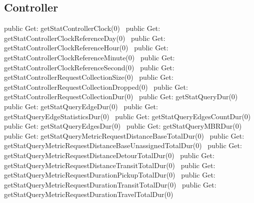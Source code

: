 \subsection{Controller}
\nwenddocs{}\plusendmoddef
public \LA{}Get: getStatControllerClock(0)~{\nwtagstyle{}}\RA{}
public \LA{}Get: getStatControllerClockReferenceDay(0)~{\nwtagstyle{}}\RA{}
public \LA{}Get: getStatControllerClockReferenceHour(0)~{\nwtagstyle{}}\RA{}
public \LA{}Get: getStatControllerClockReferenceMinute(0)~{\nwtagstyle{}}\RA{}
public \LA{}Get: getStatControllerClockReferenceSecond(0)~{\nwtagstyle{}}\RA{}
public \LA{}Get: getStatControllerRequestCollectionSize(0)~{\nwtagstyle{}}\RA{}
public \LA{}Get: getStatControllerRequestCollectionDropped(0)~{\nwtagstyle{}}\RA{}
public \LA{}Get: getStatControllerRequestCollectionDur(0)~{\nwtagstyle{}}\RA{}
public \LA{}Get: getStatQueryDur(0)~{\nwtagstyle{}}\RA{}
public \LA{}Get: getStatQueryEdgeDur(0)~{\nwtagstyle{}}\RA{}
public \LA{}Get: getStatQueryEdgeStatisticsDur(0)~{\nwtagstyle{}}\RA{}
public \LA{}Get: getStatQueryEdgesCountDur(0)~{\nwtagstyle{}}\RA{}
public \LA{}Get: getStatQueryEdgesDur(0)~{\nwtagstyle{}}\RA{}
public \LA{}Get: getStatQueryMBRDur(0)~{\nwtagstyle{}}\RA{}
public \LA{}Get: getStatQueryMetricRequestDistanceBaseTotalDur(0)~{\nwtagstyle{}}\RA{}
public \LA{}Get: getStatQueryMetricRequestDistanceBaseUnassignedTotalDur(0)~{\nwtagstyle{}}\RA{}
public \LA{}Get: getStatQueryMetricRequestDistanceDetourTotalDur(0)~{\nwtagstyle{}}\RA{}
public \LA{}Get: getStatQueryMetricRequestDistanceTransitTotalDur(0)~{\nwtagstyle{}}\RA{}
public \LA{}Get: getStatQueryMetricRequestDurationPickupTotalDur(0)~{\nwtagstyle{}}\RA{}
public \LA{}Get: getStatQueryMetricRequestDurationTransitTotalDur(0)~{\nwtagstyle{}}\RA{}
public \LA{}Get: getStatQueryMetricRequestDurationTravelTotalDur(0)~{\nwtagstyle{}}\RA{}
